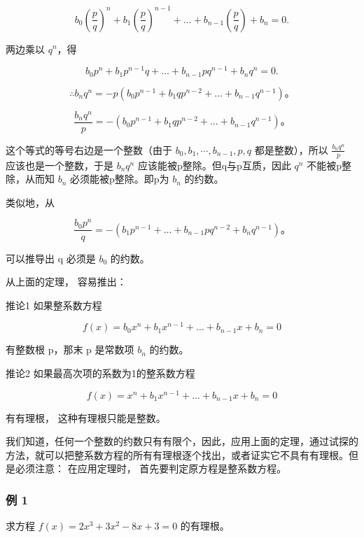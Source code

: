 \[
b _ {0} \left(\frac {p}{q}\right) ^ {n} + b _ {1} \left(\frac {p}{q}\right) ^ {n - 1} + \dots + b _ {n - 1} \left(\frac {p}{q}\right) + b _ {n} = 0.
\]

两边乘以 \(q^n\)，得

\[
b _ {0} p ^ {n} + b _ {1} p ^ {n - 1} q + \dots + b _ {n - 1} p q ^ {n - 1} + b _ {n} q ^ {n} = 0.
\]

\[
\therefore b _ {n} q ^ {n} = - p \left(b _ {0} p ^ {n - 1} + b _ {1} q p ^ {n - 2} + \dots + b _ {n - 1} q ^ {n - 1}\right)\text{。}
\]

\[
\frac {b _ {n} q ^ {n}}{p} = - \left(b _ {0} p ^ {n - 1} + b _ {1} q p ^ {n - 2} + \dots + b _ {n - 1} q ^ {n - 1}\right)\text{。}
\]

这个等式的等号右边是一个整数（由于
\(b_{0}, b_{1}, \cdots, b_{n-1}, p, q\) 都是整数），所以
\(\frac{b_{n}q^{n}}{p}\) 应该也是一个整数，于是 \(b_{n}q^{n}\)
应该能被p整除。但q与p互质，因此 \(q^{n}\) 不能被p整除，从而知 \(b_{n}\)
必须能被p整除。即p为 \(b_{n}\) 的约数。

类似地，从

\[
\frac {b _ {0} p ^ {n}}{q} = - (b _ {1} p ^ {n - 1} + \dots + b _ {n - 1} p q ^ {n - 2} + b _ {n} q ^ {n - 1})\text{。}
\]

可以推导出 q 必须是 \(b_{0}\) 的约数。

从上面的定理， 容易推出：

推论1 如果整系数方程

\[
f (x) = b _ {0} x ^ {n} + b _ {1} x ^ {n - 1} + \dots + b _ {n - 1} x + b _ {n} = 0
\]

有整数根 p，那末 p 是常数项 \(b_{n}\) 的约数。

推论2 如果最高次项的系数为1的整系数方程

\[
f (x) = x ^ {n} + b _ {1} x ^ {n - 1} + \dots + b _ {n - 1} x + b _ {n} = 0
\]

有有理根， 这种有理根只能是整数。

我们知道，任何一个整数的约数只有有限个，因此，应用上面的定理，通过试探的方法，就可以把整系数方程的所有有理根逐个找出，或者证实它不具有有理根。但是必须注意：
在应用定理时， 首先要判定原方程是整系数方程。

\subsubsection{例 1}


求方程 \(f(x) = 2x^{3} + 3x^{2} - 8x + 3 = 0\) 的有理根。

